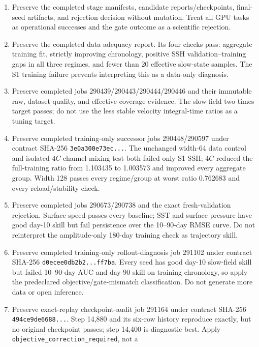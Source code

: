\documentclass[11pt]{article}
\begin{document}
\begin{enumerate}
\item Preserve the completed stage manifests, candidate reports/checkpoints, final-seed
  artifacts, and rejection decision without mutation.  Treat all GPU tasks as
  operational successes and the gate outcome as a scientific rejection.
\item Preserve the completed data-adequacy report.  Its four checks pass: aggregate
  training fit, strictly improving chronology, positive SSH validation--training gaps
  in all three regimes, and fewer than 20 effective slow-state samples.  The S1
  training failure prevents interpreting this as a data-only diagnosis.
\item Preserve completed jobs 290439/290443/290444/290446 and their immutable raw,
  dataset-quality, and effective-coverage evidence.  The slow-field two-times target
  passes; do not use the less stable velocity integral-time ratios as a tuning target.
\item Preserve completed training-only successor jobs 290448/290597 under contract SHA-256
  \texttt{3e0a300e73ec\allowbreak...}.  The unchanged width-64 data
  control and isolated
  \(4C\) channel-mixing test both failed only S1 SSH; \(4C\) reduced the full-training
  ratio from 1.103435 to 1.003573 and improved every aggregate group.  Width 128 passes
  every regime/group at worst ratio 0.762683 and every reload/stability check.
\item Preserve completed jobs 290673/290738 and the exact fresh-validation rejection.
  Surface speed passes every baseline; SST and surface pressure have good day-10 skill
  but fail persistence over the 10--90-day RMSE curve.  Do not reinterpret the
  amplitude-only 180-day training check as trajectory skill.
\item Preserve completed training-only rollout-diagnosis job 291102 under contract
  SHA-256 \texttt{d0ecee0db2b2\allowbreak...\allowbreak ff7ba}.  Every seed has good day-10 slow-field
  skill but failed 10--90-day AUC and day-90 skill on training chronology, so apply
  the predeclared objective/gate-mismatch classification.  Do not generate more data
  or open inference.
\item Preserve exact-replay checkpoint-audit job 291164 under contract SHA-256
  \texttt{494ce9de6688\allowbreak...}.  Step 14,880 and its six-row
  history reproduce exactly, but no original checkpoint passes; step 14,400 is
  diagnostic best.  Apply \texttt{objective\_correction\_required}, not a

\end{enumerate}
\end{document}
